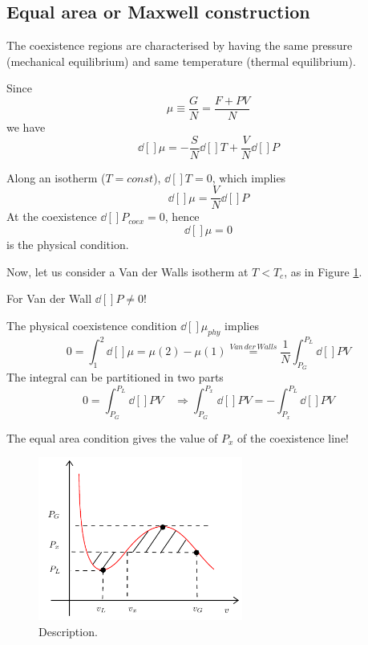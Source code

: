 \documentclass[../main/main.tex]{subfiles}
\begin{document}
\subsection{Equal area or Maxwell construction}
\begin{remark}
The coexistence regions are characterised by having the same pressure (mechanical equilibrium) and same temperature (thermal equilibrium).
\end{remark}

Since
\begin{equation}
  \mu \equiv \frac{G}{N} = \frac{F+PV}{N}
\end{equation}
we have
\begin{equation}
  \dd[]{\mu } = - \frac{S}{N} \dd[]{T} + \frac{V}{N} \dd[]{P}
\end{equation}

Along an isotherm (\( T=const \)), \( \dd[]{T} = 0  \), which implies
\begin{equation}
  \dd[]{\mu } = \frac{V}{N} \dd[]{P}
\end{equation}
At the coexistence \( \dd[]{P}_{coex} = 0  \), hence
\begin{equation}
  \dd[]{\mu } = 0
\end{equation}
is the physical condition.

Now, let us consider a Van der Walls isotherm at \( T < T_c \), as in Figure \ref{fig:14_4}.
\begin{remark}
For Van der Wall \( \dd[]{P} \neq 0  \)!
\end{remark}
The physical coexistence condition \( \dd[]{\mu }_{phy}  \) implies
\begin{equation}
  0 = \int_{1}^{2} \dd[]{\mu } = \mu (2) - \mu (1) \overset{Van\, der\, Walls}{=} \frac{1}{N} \int_{P_G}^{P_L} \dd[]{P} V
\end{equation}
The integral can be partitioned in two parts
\begin{equation}
  0 = \int_{P_G}^{P_L} \dd[]{P}V \quad \Rightarrow \int_{P_G}^{P_x} \dd[]{P}V = - \int_{P_x}^{P_L} \dd[]{P} V
\end{equation}
\begin{remark}
The equal area condition gives the value of \( P_x \) of the coexistence line!
\end{remark}

\begin{figure}[h!]
\centering
\includegraphics[width=0.6\textwidth]{../lessons/14_image/5.pdf}
\caption{\label{fig:14_4} Description.}
\end{figure}
\end{document}
